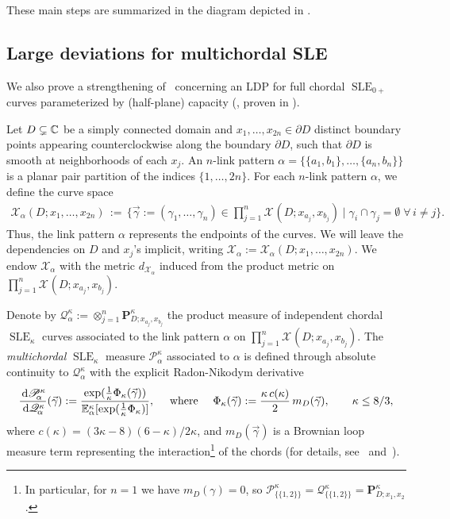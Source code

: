 \documentclass[a4paper, 11pt]{article}
\theoremstyle{definition}
\numberwithin{equation}{section}
\numberwithin{figure}{section}
\newcommand{\SLE}[1][]{\operatorname{SLE}_{#1}}
\newcommand{\Hpaths}[1][]{\mathscr{X}_{#1}} %
\newcommand{\dHpaths}[1][]{d_{\!\Hpaths[#1]}}
\newcommand{\mcIndependent}[2]{\mathscr{Q}_{\!#1}^{#2}}
\newcommand{\mcMeasure}[2]{\mathscr{P}_{\!\!#1}^{#2}}
\newcommand{\SLEmeasure}[2]{\mathbf{P}^{#2}_{\!\!#1}}
\newcommand{\loopterm}[1]{m_{#1}}
\begin{document}
These main steps are summarized in the diagram depicted in .

\subsection{Large deviations for multichordal SLE}

We also prove a strengthening of~\cite[Theorem~1.5]{Peltola-Wang:LDP} concerning an LDP for
full chordal $\SLE[0+]$ curves parameterized by (half-plane) capacity (, proven in ). 

Let $D \subsetneq \mathbb{C}$ be a simply connected domain 
and $x_1, \ldots, x_{2n} \in \partial D$ distinct boundary points appearing counterclockwise along the boundary $\partial D$, 
such that $\partial D$ is smooth at neighborhoods of each $x_j$. 
An $n$-link pattern $\alpha = \{\{a_1, b_1\}, \ldots, \{a_n, b_n\}\}$ is a planar pair partition of 
the indices $\{1, \ldots, 2n\}$. For each $n$-link pattern $\alpha$, we define the curve space
\begin{align*}
\Hpaths[\alpha](D;x_1, \ldots, x_{2n}) 
\, := \, \Big\{\vec\gamma := (\gamma_1, \ldots, \gamma_n) \in \prod_{j=1}^n \Hpaths(D;x_{a_j}, x_{b_j}) \;|\; \gamma_i \cap \gamma_j = \emptyset \; \forall \, i\ne j\Big\} .
\end{align*}
Thus, the link pattern $\alpha$ represents the endpoints of the curves. 
We will leave the dependencies on $D$ and $x_j$'s implicit, writing 
$\Hpaths[\alpha] := \Hpaths[\alpha](D; x_1, \ldots, x_{2n})$.
We endow $\Hpaths[\alpha]$ with the metric $\dHpaths[\alpha]$  induced from the product metric 
on $\prod_{j=1}^n\Hpaths(D;x_{a_j},x_{b_j})$.


Denote by $\mcIndependent{\alpha}{\kappa} := \otimes_{j=1}^n \SLEmeasure{D;x_{a_j},x_{b_j}}{\kappa}$ the product measure of independent chordal $\SLE[\kappa]$ curves associated to the link pattern $\alpha$ on $\prod_{j=1}^n\Hpaths(D;x_{a_j}, x_{b_j})$. 
The \emph{multichordal} $\SLE[\kappa]$ measure $\mcMeasure{\alpha}{\kappa}$ associated to $\alpha$ is defined through absolute continuity to $\mcIndependent{\alpha}{\kappa}$ with the explicit Radon-Nikodym derivative
\begin{align} \label{eq:Radon-Nikodym_derivative}
\frac{\ud\mcMeasure{\alpha}{\kappa}}{\ud\mcIndependent{\alpha}{\kappa}}(\vec\gamma) := \frac{\exp(\frac{1}{\kappa}\Phi_\kappa(\vec\gamma))}{\mathbb E_\alpha^\kappa[\exp(\frac{1}{\kappa}\Phi_\kappa)]}, \quad \textnormal{ where }\quad \Phi_\kappa(\vec\gamma) := \frac{\kappa \, c(\kappa)}{2}\,\loopterm{D}(\vec\gamma), \qquad \kappa \leq 8/3 ,
\end{align}
where $c(\kappa) = (3\kappa-8)(6-\kappa)/2\kappa$, 
and $\loopterm{D}(\vec\gamma)$ is a Brownian loop measure term representing the interaction\footnote{In particular, for $n=1$ we have $\loopterm{D}(\gamma) = 0$, so $\mcMeasure{\{\{1,2\}\}}{\kappa} = \mcIndependent{\{\{1,2\}\}}{\kappa} = \SLEmeasure{D;x_1,x_2}{\kappa}$.} 
of the chords 
(for details, see~\cite{Lawler:Partition_functions_loop_measure_and_versions_of_SLE, 
Peltola-Wu:Global_and_local_multiple_SLEs_and_connection_probabilities_for_level_lines_of_GFF} 
and~\cite[Section~3.1]{Peltola-Wang:LDP}). 
\end{document}
